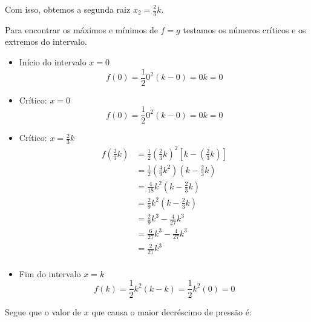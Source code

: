 \documentclass{article}
\begin{document}
Com isso, obtemos a segunda raiz \(x_2 = \frac{2}{3}k\).

Para encontrar os máximos e mínimos de \(f = g\) testamos os números críticos
e os extremos do intervalo.

\begin{itemize}
    \item Início do intervalo \(x = 0\)
          \[f(0) = \frac{1}{2}0^2(k-0) = 0k = 0\]
    \item Crítico: \(x = 0\)
          \[f(0) = \frac{1}{2}0^2(k-0) = 0k = 0\]
    \item Crítico: \(x = \frac{2}{3}k\)
          \begin{align*}
              f
              \left(
              \frac{2}{3}k
              \right)
               & =
              \frac{1}{2}
              \left(
              \frac{2}{3}k
              \right)
              ^2
              \left[
                  k-
                  \left(
                  \frac{2}{3}k
                  \right)
                  \right]
              \\
               & =
              \frac{1}{2}
              \left(
              \frac{4}{9}k^2
              \right)
              \left(
              k-
              \frac{2}{3}k
              \right)
              \\
               & =
              \frac{4}{18}
              k^2
              \left(
              k-
              \frac{2}{3}k
              \right)
              \\
               & =
              \frac{2}{9}
              k^2
              \left(
              k-
              \frac{2}{3}k
              \right)
              \\
               & =
              \frac{2}{9}
              k^3
              -
              \frac{4}{27}k^3
              \\
               & =
              \frac{6}{27}
              k^3
              -
              \frac{4}{27}k^3
              \\
               & =
              \frac{2}{27}
              k^3
              \\
          \end{align*}
    \item Fim do intervalo \(x = k\)
          \[f(k) = \frac{1}{2}k^2(k-k) = \frac{1}{2}k^2(0) = 0 \]
\end{itemize}

Segue que o valor de \(x\) que causa o maior decréscimo de pressão é:
\end{document}
